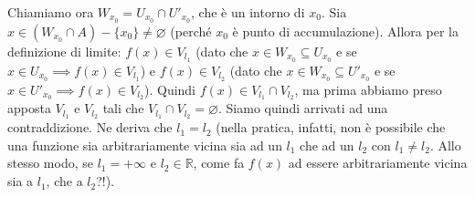 \documentclass{article}
\begin{document}

\noindent Chiamiamo ora $W_{x_0} = U_{x_0} \cap U'_{x_0}$, che è un intorno di $x_0$. Sia $x \in (W_{x_0} \cap A) - \{x_0\} \neq \varnothing$ (perché $x_0$ è punto di accumulazione). Allora per la definizione di limite: $f(x) \in V_{l_1}$ (dato che $x \in W_{x_0} \subseteq U_{x_0}$ e se $x \in U_{x_0} \implies f(x) \in V_{l_1}$) e $f(x) \in V_{l_2}$ (dato che $x \in W_{x_0} \subseteq U'_{x_0}$ e se $x \in U'_{x_0} \implies f(x) \in V_{l_2}$). Quindi $f(x) \in V_{l_1} \cap V_{l_2}$, ma prima abbiamo preso apposta $V_{l_1}$ e $V_{l_2}$ tali che $V_{l_1} \cap V_{l_2} = \varnothing$. Siamo quindi arrivati ad una contraddizione. Ne deriva che $l_1 = l_2$ (nella pratica, infatti, non è possibile che una funzione sia arbitrariamente vicina sia ad un $l_1$ che ad un $l_2$ con $l_1 \neq l_2$. Allo stesso modo, se $l_1 = + \infty$ e $l_2 \in \mathbb{R}$, come fa $f(x)$ ad essere arbitrariamente vicina sia a $l_1$, che a $l_2$?!).
\end{document}
